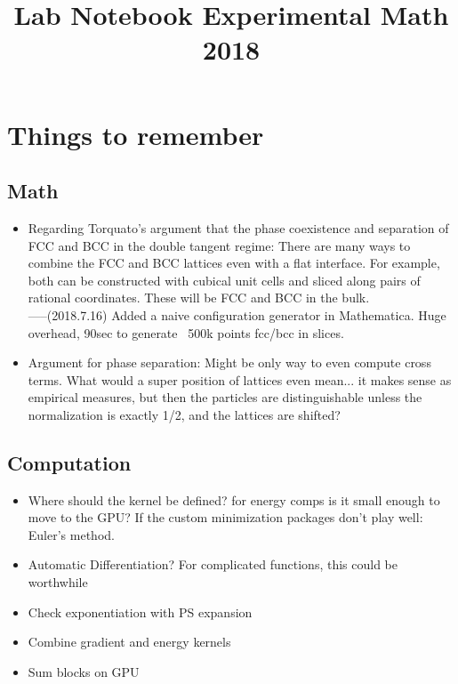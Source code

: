 \documentclass[onecolumn,11pt,final]{amsart}
\title{Lab Notebook Experimental Math 2018}
\author{}
\begin{document}


\maketitle

\section{Things to remember}
\subsection{Math}
\begin{itemize}
\item Regarding Torquato's argument that the phase coexistence and separation of FCC and BCC in the double tangent regime: There are many ways to combine the FCC and BCC lattices even with a flat interface. For example, both can be constructed with cubical unit cells and sliced along pairs of rational coordinates.  These will be FCC and BCC in the bulk.
 \\-----(2018.7.16) Added a naive configuration generator in Mathematica.  Huge overhead, 90sec to generate ~500k points fcc/bcc in slices.
\newline



\item Argument for phase separation:  Might be only way to even compute cross terms.  What would a super position of lattices even mean... it makes sense as empirical measures, but then the particles are distinguishable unless the normalization is exactly 1/2, and the lattices are shifted?
\end{itemize}

\subsection{Computation}

\begin{itemize}
\item Where should the kernel be defined?  for energy comps is it small enough to move to the GPU?
 If the custom minimization packages don't play well: Euler's method.

\item Automatic Differentiation?  For complicated functions, this could be worthwhile
\item Check exponentiation with PS expansion
\item Combine gradient and energy kernels 
\item Sum blocks on GPU
\end{itemize}
\end{document}
